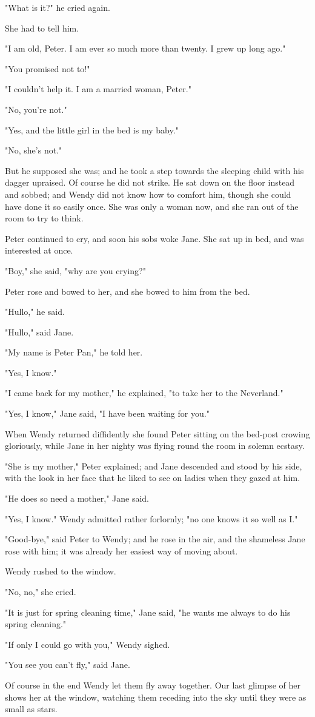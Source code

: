 "What is it?" he cried again.


She had to tell him.


"I am old, Peter. I am ever so much more than twenty. I grew up long ago."


"You promised not to!"


"I couldn't help it. I am a married woman, Peter."


"No, you're not."


"Yes, and the little girl in the bed is my baby."


"No, she's not."


But he supposed she was; and he took a step towards the sleeping child
with his dagger upraised. Of course he did not strike. He sat down on the
floor instead and sobbed; and Wendy did not know how to comfort him,
though she could have done it so easily once. She was only a woman now,
and she ran out of the room to try to think.


Peter continued to cry, and soon his sobs woke Jane. She sat up in bed,
and was interested at once.


"Boy," she said, "why are you crying?"


Peter rose and bowed to her, and she bowed to him from the bed.


"Hullo," he said.


"Hullo," said Jane.


"My name is Peter Pan," he told her.


"Yes, I know."


"I came back for my mother," he explained, "to take her to the Neverland."


"Yes, I know," Jane said, "I have been waiting for you."


When Wendy returned diffidently she found Peter sitting on the bed-post
crowing gloriously, while Jane in her nighty was flying round the room in
solemn ecstasy.


"She is my mother," Peter explained; and Jane descended and stood by his
side, with the look in her face that he liked to see on ladies when they
gazed at him.


"He does so need a mother," Jane said.


"Yes, I know." Wendy admitted rather forlornly; "no one knows it so well
as I."


"Good-bye," said Peter to Wendy; and he rose in the air, and the shameless
Jane rose with him; it was already her easiest way of moving about.


Wendy rushed to the window.


"No, no," she cried.


"It is just for spring cleaning time," Jane said, "he wants me always to
do his spring cleaning."


"If only I could go with you," Wendy sighed.


"You see you can't fly," said Jane.


Of course in the end Wendy let them fly away together. Our last glimpse of
her shows her at the window, watching them receding into the sky until
they were as small as stars.


